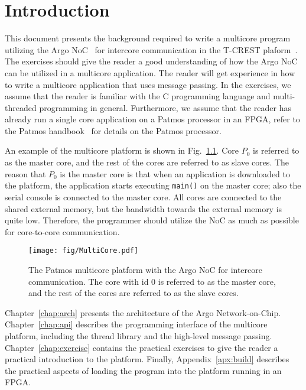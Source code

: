 \documentclass[a4paper,fontsize=10pt,twoside,DIV15,BCOR12mm,headinclude=true,footinclude=false,pagesize,bibtotoc]{scrbook}
\newcommand{\code}[1]{{\texttt{#1}}}
\begin{document}
\mainmatter

\chapter{Introduction}

This document presents the background required to write a multicore program utilizing the Argo NoC~\cite{t-crest:argo:tvlsi2015} for intercore communication in the T-CREST plaform~\cite{t-crest:2015}.
The exercises should give the reader a good understanding of how the Argo NoC can be utilized in a multicore application.
The reader will get experience in how to write a multicore application that uses message passing.
In the exercises, we assume that the reader is familiar with the C programming language and multi-threaded programming in general.
Furthermore, we assume that the reader has already run a single core application on a Patmos processor in an FPGA, refer to the Patmos handbook~\cite{patmos:handbook} for details on the Patmos processor.

An example of the multicore platform is shown in Fig.~\ref{fig:mc-patmos}. Core $P_0$ is referred to as the master core, and the rest of the cores are referred to as slave cores. The reason that $P_0$ is the master core is that when an application is downloaded to the platform, the application starts executing \code{main()} on the master core; also the serial console  is connected to the master core. All cores are connected to the shared external memory, but the bandwidth towards the external memory is quite low.
Therefore, the programmer should utilize the NoC as much as possible for core-to-core communication.
\begin{figure}[h]
\centering
\texttt{[image: fig/MultiCore.pdf]}
\caption{The Patmos multicore platform with the Argo NoC for intercore communication.
The core with id 0 is referred to as the master core, and the rest of the cores are referred to as the slave cores.}
\label{fig:mc-patmos}
\end{figure}

Chapter~\ref{chap:arch} presents the architecture of the Argo Network-on-Chip.
Chapter~\ref{chap:api} describes the programming interface of the multicore platform, including the thread library and the high-level message passing.
Chapter~\ref{chap:exercise} contains the practical exercises to give the reader a practical introduction to the platform.
Finally, Appendix~\ref{apx:build} describes the practical aspects of loading the program into the platform running in an FPGA.
\end{document}
